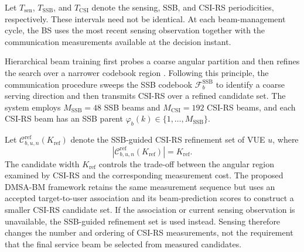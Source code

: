 Let \(T_{\mathrm{sen}}\), \(T_{\mathrm{SSB}}\), and
\(T_{\mathrm{CSI}}\) denote the sensing, SSB, and CSI-RS periodicities,
respectively.  These intervals need not be identical.  At each beam-management
cycle, the BS uses the most recent sensing observation together with the
communication measurements available at the decision instant.

Hierarchical beam training first probes a coarse angular partition and then
refines the search over a narrower codebook region
\cite{xiao2016hierarchicalcodebook}.  Following this principle, the
communication procedure sweeps the SSB codebook
\(\mathcal{F}^{\mathrm{SSB}}_b\) to identify a coarse serving direction and
then transmits CSI-RS over a refined candidate set.  The system employs
\(M_{\mathrm{SSB}}=48\) SSB beams and \(M_{\mathrm{CSI}}=192\) CSI-RS beams,
and each CSI-RS beam has an SSB parent
\(\varphi_b(k)\in\{1,\ldots,M_{\mathrm{SSB}}\}\).

Let \(\mathcal{C}^{\mathrm{ref}}_{b,u,n}(K_{\mathrm{ref}})\) denote the
SSB-guided CSI-RS refinement set of VUE \(u\), where
\begin{equation}
    \left|\mathcal{C}^{\mathrm{ref}}_{b,u,n}(K_{\mathrm{ref}})\right|
    =K_{\mathrm{ref}}.
    \label{eq:system-refinement-width}
\end{equation}
The candidate width \(K_{\mathrm{ref}}\) controls the trade-off between the
angular region examined by CSI-RS and the corresponding measurement cost.  The
proposed DMSA-BM framework retains the same measurement sequence but uses an
accepted target-to-user association and its beam-prediction scores to construct
a smaller CSI-RS candidate set.  If the association or current sensing
observation is unavailable, the SSB-guided refinement set is used instead.
Sensing therefore changes the number and ordering of CSI-RS measurements, not
the requirement that the final service beam be selected from measured
candidates.

